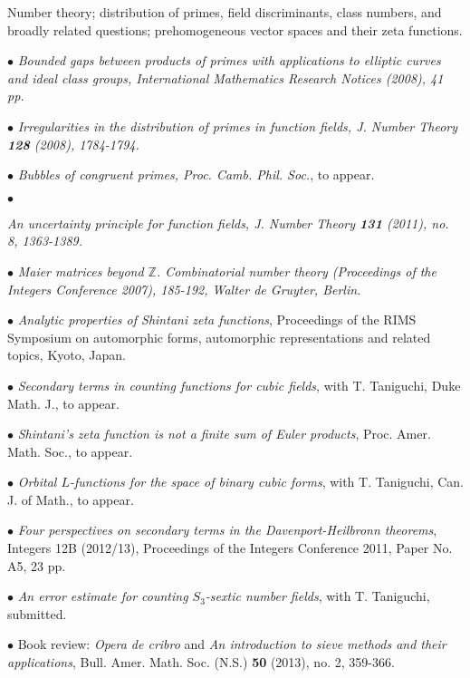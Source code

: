 \documentclass{article}
\newcommand{\categorywidth}{1in}        %
\newcommand{\infowidth}{5.8in}          %
\newcommand{\categorysep}{5pt}
\newcommand{\catlistlabel}[1]%
{\raisebox{0pt}[1ex][0pt]{\makebox[\labelwidth][l]%
    {\parbox[t]{\labelwidth}{\hspace{0pt}\textbf{#1}}}}}
\newenvironment{categories}{\begin{list}{}{
      \setlength{\labelwidth}{\categorywidth}
      \setlength{\leftmargin}{\labelwidth}
      \addtolength{\leftmargin}{\labelsep}
      \setlength{\topsep}{20pt}
      \setlength{\itemsep}{\categorysep}
      \renewcommand{\makelabel}{\catlistlabel}
      }}{\end{list}}
\newcommand{\category}[1]{\item[#1]}
\newcommand{\rawentry}[1]{{\begin{minipage}[t]{\infowidth}{#1}
    \end{minipage}}}
\begin{document}
\begin{flushleft}
\begin{categories}
  \rawentry{Number theory; distribution of primes, field discriminants, class numbers, 
  and broadly related questions; prehomogeneous vector spaces and their zeta functions. \\}





  \category{Research \\ Publications}

  $\bullet$ {\itshape Bounded gaps between products of primes with applications
to elliptic curves and ideal class groups\upshape, International Mathematics
Research Notices (2008), 41 pp.}

  $\bullet$ {\itshape Irregularities in the distribution of primes in function fields\upshape, 
   J. Number Theory \textbf{128} (2008), 1784-1794.}

  $\bullet$ {\itshape Bubbles of congruent primes\upshape,
  Proc. Camb. Phil. Soc.}, to appear.

  $\bullet$ {\itshape An uncertainty principle for function fields\upshape,
J. Number Theory \textbf{131} (2011), no. 8, 1363-1389. 

  $\bullet$ {\itshape Maier matrices beyond $\mathbb{Z}$\upshape.
Combinatorial number theory
(Proceedings of the Integers Conference 2007), 185-192, Walter de Gruyter, Berlin.}

  $\bullet$ {\itshape Analytic properties of Shintani zeta functions}, Proceedings
of the RIMS Symposium on automorphic forms, automorphic representations and related topics, Kyoto, Japan.

  $\bullet$ {\itshape Secondary terms in counting functions for cubic fields}, with T. Taniguchi, Duke Math. J., to appear.

  $\bullet$ {\itshape Shintani's zeta function is not a finite sum of Euler products},
Proc. Amer. Math. Soc., to appear.

  $\bullet$ {\itshape Orbital $L$-functions for the space of binary cubic forms}, with T. Taniguchi,
Can. J. of Math., to appear.

  $\bullet$ {\itshape Four perspectives on secondary terms in the Davenport-Heilbronn theorems}, Integers 12B
(2012/13),
Proceedings of the Integers Conference 2011, Paper No. A5, 23 pp.

  $\bullet$ {\itshape An error estimate for counting $S_3$-sextic number fields}, with T. Taniguchi, submitted.

  $\bullet$ Book review: {\itshape Opera de cribro} and {\itshape
  An introduction to sieve methods and their applications},
  Bull. Amer. Math. Soc. (N.S.) \textbf{50} (2013), no. 2, 359-366.

}
\end{categories}
\end{flushleft}
\end{document}

